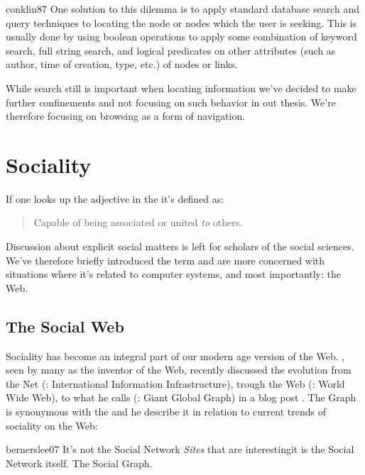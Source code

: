 \begin{citequote}[p.~38]{conklin87}
  One solution to this dilemma is to apply standard data\-base search and
  query techniques to locating the node or nodes which the user is seeking.
  This is usually done by using boolean operations to apply some combination
  of keyword search, full string search, and logical predicates on other
  attributes (such as author, time of creation, type, etc.) of nodes or links.
\end{citequote}

While search still is important when locating information we've decided
to make further confinements and not focusing on such behavior in out thesis.
We're therefore focusing on browsing as a form of navigation.

\section{Sociality}

If one looks up the adjective  in the
 \citep[p.~905]{simpson89}
it's defined as:

\begin{quote}
  Capable of being associated or united \emph{to} others.
\end{quote}

Discussion about explicit social matters is left for scholars of the social
sciences. We've therefore briefly introduced the term and are more concerned
with situations where it's related to computer systems, and most importantly:
the Web.

\subsection{The Social Web}
\label{section:background.sociality.the.social.web}

Sociality has become an integral part of our modern age version of the Web.
\citeauthor{bernerslee07}, seen by many as the inventor of the Web,
recently discussed the evolution from the Net (: International
Information Infrastructure), trough the Web (: World Wide Web),
to what he calls  (: Giant Global Graph) in a
blog post \citeyearpar{bernerslee07}. The Graph is synonymous with the
%
and he describe it in relation to
current trends of sociality on the Web:
\begin{citequote}{bernerslee07}
  It's not the Social Network \emph{Sites} that are interesting\dash{}it is
  the Social Network itself. The Social Graph.
\end{citequote}

